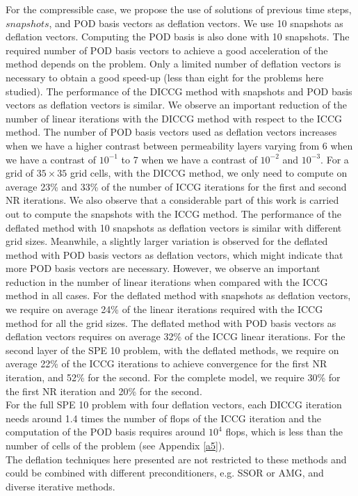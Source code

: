 \documentclass[12pt]{article}
\begin{document}
For the compressible case, we propose the use of solutions of previous time steps, $snapshots$, and POD basis vectors as deflation vectors. We use 10 snapshots as deflation vectors. Computing the POD basis is also done with 10 snapshots. The required number of POD basis vectors to achieve a good acceleration of the method depends on the problem. Only a limited number of deflation vectors is necessary to obtain a good speed-up (less than eight for the problems here studied). The performance of the DICCG method with snapshots and POD basis vectors as deflation vectors is similar. We observe an important reduction of the number of linear iterations with the DICCG method with respect to the ICCG method. The number of POD basis vectors used as deflation vectors increases when we have a higher contrast between permeability layers varying from 6 when we have a contrast of $10^{-1}$ to 7 when we have a contrast of $10^{-2}$ and $10^{-3}$.  For a grid of $35\times 35$ grid cells, with the DICCG method, we only need to 
compute on average 23\% and 33\% of the number of ICCG iterations for the first and second NR iterations. We also observe that a considerable part of this work is carried out to compute the snapshots with the ICCG method. 
The performance of the deflated method with 10 snapshots as deflation vectors is similar with different grid sizes. Meanwhile, a slightly larger variation is observed for the deflated method with POD basis vectors as deflation vectors, which might indicate that more POD basis vectors are necessary. However, we observe an important reduction in the number of linear iterations when compared with the ICCG method in all cases. For the deflated method with snapshots as deflation vectors, we require on average 24\% of the linear iterations required with the ICCG method for all the grid sizes. The deflated method with POD basis vectors as deflation vectors requires on average 32\% of the ICCG linear iterations.
For the second layer of the SPE 10 problem, with the deflated methods, we require on average 22\% of the ICCG iterations to achieve convergence for the first NR iteration, and 52\% for the second. For the complete model, we require 30\% for the first NR iteration and 20\% for the second. \\
For the full SPE 10 problem with four deflation vectors, each DICCG iteration needs around 1.4 times the number of flops of the ICCG iteration and the computation of the POD basis requires around $10^4$ flops, which is less than the number of cells of the problem (see Appendix \ref{a5}).\\
The deflation techniques here presented are not restricted to these methods and could be 
combined with different preconditioners, e.g. SSOR or AMG, and diverse iterative methods.
\end{document}
